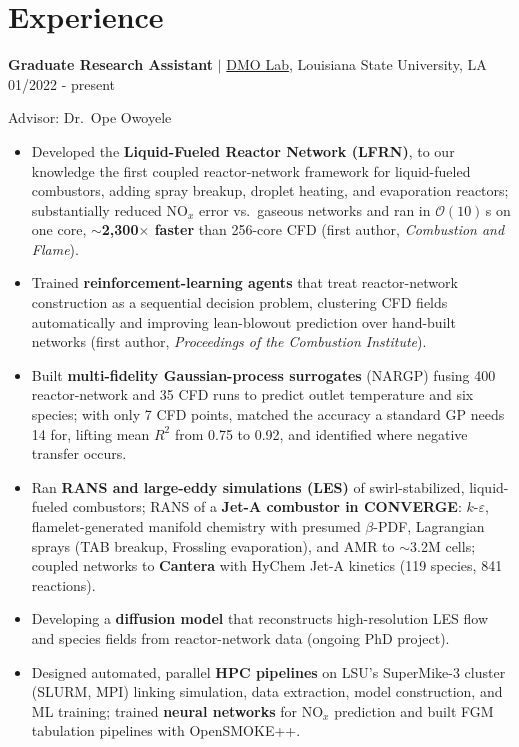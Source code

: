 \documentclass[letterpaper,10pt]{article}
\newcommand{\entry}[3]{\textbf{#1} $|$ #2 \hfill #3\par}
\begin{document}
\section{Experience}
\entry{Graduate Research Assistant}{\href{https://dmo-lab.com}{DMO Lab}, Louisiana State University, LA}{01/2022 - present}
Advisor: Dr.\ Ope Owoyele
\begin{itemize}
  \item Developed the \textbf{Liquid-Fueled Reactor Network (LFRN)}, to our knowledge the first coupled reactor-network
        framework for liquid-fueled combustors, adding spray breakup, droplet heating, and evaporation reactors; substantially
        reduced NO$_x$ error vs.\ gaseous networks and ran in $\mathcal{O}(10)$\,s on one core, \textbf{$\sim$2,300$\times$ faster}
        than 256-core CFD (first author, \textit{Combustion and Flame}).
  \item Trained \textbf{reinforcement-learning agents} that treat reactor-network construction as a sequential decision
        problem, clustering CFD fields automatically and improving lean-blowout prediction over hand-built networks
        (first author, \textit{Proceedings of the Combustion Institute}).
  \item Built \textbf{multi-fidelity Gaussian-process surrogates} (NARGP) fusing 400 reactor-network and 35 CFD runs to
        predict outlet temperature and six species; with only 7 CFD points, matched the accuracy a standard GP needs 14 for,
        lifting mean $R^2$ from 0.75 to 0.92, and identified where negative transfer occurs.
  \item Ran \textbf{RANS and large-eddy simulations (LES)} of swirl-stabilized, liquid-fueled combustors; RANS of a \textbf{Jet-A combustor in CONVERGE}: $k$-$\varepsilon$, flamelet-generated manifold
        chemistry with presumed $\beta$-PDF, Lagrangian sprays (TAB breakup, Frossling evaporation), and AMR to $\sim$3.2M cells;
        coupled networks to \textbf{Cantera} with HyChem Jet-A kinetics (119 species, 841 reactions).
  \item Developing a \textbf{diffusion model} that reconstructs high-resolution LES flow and species fields from
        reactor-network data (ongoing PhD project).
  \item Designed automated, parallel \textbf{HPC pipelines} on LSU's SuperMike-3 cluster (SLURM, MPI) linking simulation,
        data extraction, model construction, and ML training; trained \textbf{neural networks} for NO$_x$ prediction and built
        FGM tabulation pipelines with OpenSMOKE++.
\end{itemize}
\end{document}

